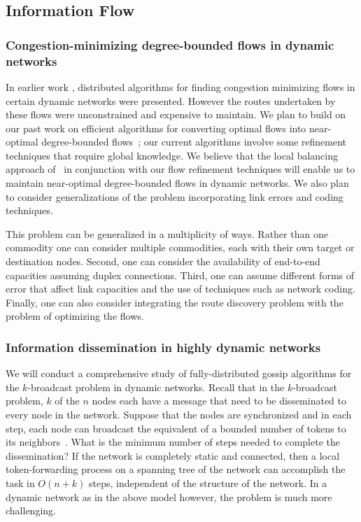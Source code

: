 \subsection{Information Flow}

\subsubsection{Congestion-minimizing degree-bounded flows in dynamic
  networks} In earlier work \cite{awerbuch+l:flow}, distributed
algorithms for finding congestion minimizing flows in certain dynamic
networks were presented.  However the routes undertaken by these flows
were unconstrained and expensive to maintain.  We plan to build on our
past work on efficient algorithms for converting optimal flows into
near-optimal degree-bounded
flows~\cite{chen+klrsv:confluent,chen+smr:confluent}; our current
algorithms involve some refinement techniques that require global
knowledge.  We believe that the local balancing approach
of~\cite{awerbuch+l:flow} in conjunction with our flow refinement
techniques will enable us to maintain near-optimal degree-bounded
flows in dynamic networks.  We also plan to consider generalizations
of the problem incorporating link errors and coding techniques.

This problem can be generalized in a multiplicity of ways. Rather than
one commodity one can consider multiple commodities, each with their
own target or destination nodes. Second, one can consider the
availability of end-to-end capacities assuming duplex
connections. Third, one can assume different forms of error that
affect link capacities and the use of techniques such as network
coding. Finally, one can also consider integrating the route discovery
problem with the problem of optimizing the flows.

\subsubsection{Information dissemination in highly dynamic networks} 
We will conduct a comprehensive study of fully-distributed gossip
algorithms for the $k$-broadcast problem in dynamic networks.  Recall
that in the $k$-broadcast problem, $k$ of the $n$ nodes each have a
message that need to be disseminated to every node in the network.
Suppose that the nodes are synchronized and in each step, each node
can broadcast the equivalent of a bounded number of tokens to its
neighbors~\cite{kuhn+lo:dynamic}.  What is the minimum number of steps
needed to complete the dissemination?  If the network is completely
static and connected, then a local token-forwarding process on a
spanning tree of the network can accomplish the task in $O(n + k)$
steps, independent of the structure of the network.  In a dynamic
network as in the above model however, the problem is much more
challenging.

